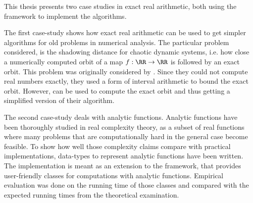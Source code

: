 This thesis presents two case studies in exact real arithmetic, both using the
\irram framework to implement the algorithms.

The first case-study shows how exact real arithmetic can be used to get simpler
algorithms for old problems in numerical analysis.
The particular problem considered, is the shadowing distance for chaotic
dynamic systems, i.e. how close a numerically computed orbit of a map $f: \RR
\to \RR$ is followed by an exact orbit.
This problem was originally considered by  \cite{asda}. 
Since they could not compute real numbers exactly, they used a form of interval
arithmetic to bound the exact orbit.
However, \irram can be used to compute the exact orbit and thus getting a
simplified version of their algorithm.

The second case-study deals with analytic functions. 
Analytic functions have been thoroughly studied in real complexity theory, as a
subset of real functions where many problems that are computationally hard in
the general case become feasible. 
To show how well those complexity claims compare with practical
implementations, data-types to represent analytic functions have been written.
The implementation is meant as an extension to the \irram framework, that
provides user-friendly classes for computations with analytic functions.
Empirical evaluation was done on the running time of those classes and compared
with the expected running times from the theoretical examination.

